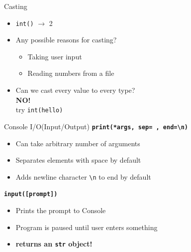         \begin{frame}{Casting}
            \LARGE
            \begin{itemize}
                \item \texttt{int(\textquotesingle)} $\to$ 2
                \pause
                \item Any possible reasons for casting?
                \pause
                \begin{itemize}
                    \LARGE
                    \item Taking user input\\
                    \item Reading numbers from a file\\
                \end{itemize}
                \pause
                \item Can we cast every value to every type?
                \\
                \pause
                \textbf{NO!}
                \\try \texttt{int(\textquotesingle hello\textquotesingle)}
            \end{itemize}
        \end{frame}

        \begin{frame}{Console I/O(Input/Output)}
            \huge
            \textbf{\texttt{print(*args, sep=\textquotesingle \ \textquotesingle, end=\textquotesingle \textbackslash n\textquotesingle )}}
            \begin{itemize}
                \LARGE
                \item Can take arbitrary number of arguments
                \item Separates elements with space by default
                \item Adds newline character \texttt{\textquotesingle \textbackslash n\textquotesingle} to end by default
            \end{itemize}

            \textbf{\texttt{input([prompt])}}
            \begin{itemize}
                \LARGE
                \item Prints the prompt to Console
                \item Program is paused until user enters something
                \item \textbf{returns an \texttt{str} object!}
            \end{itemize}
        \end{frame}


